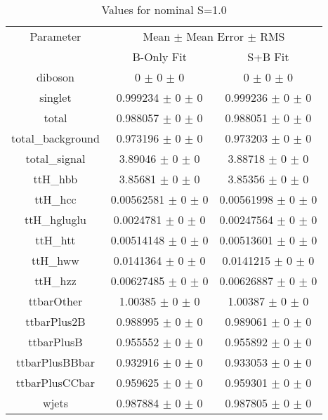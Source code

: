 \begin{table}
\centering
\caption{Values for nominal S=1.0}
\begin{tabular}{ccc}
\toprule
Parameter 	& \multicolumn{2}{c}{Mean $\pm$ Mean Error $\pm$ RMS}\\
 	& B-Only Fit & S+B Fit\\
\midrule
diboson 	& \num{0} $\pm$ \num{0} $\pm$ \num{0} 	& \num{0} $\pm$ \num{0} $\pm$ \num{0}\\
singlet 	& \num{0.999234} $\pm$ \num{0} $\pm$ \num{0} 	& \num{0.999236} $\pm$ \num{0} $\pm$ \num{0}\\
total 	& \num{0.988057} $\pm$ \num{0} $\pm$ \num{0} 	& \num{0.988051} $\pm$ \num{0} $\pm$ \num{0}\\
total\_background 	& \num{0.973196} $\pm$ \num{0} $\pm$ \num{0} 	& \num{0.973203} $\pm$ \num{0} $\pm$ \num{0}\\
total\_signal 	& \num{3.89046} $\pm$ \num{0} $\pm$ \num{0} 	& \num{3.88718} $\pm$ \num{0} $\pm$ \num{0}\\
ttH\_hbb 	& \num{3.85681} $\pm$ \num{0} $\pm$ \num{0} 	& \num{3.85356} $\pm$ \num{0} $\pm$ \num{0}\\
ttH\_hcc 	& \num{0.00562581} $\pm$ \num{0} $\pm$ \num{0} 	& \num{0.00561998} $\pm$ \num{0} $\pm$ \num{0}\\
ttH\_hgluglu 	& \num{0.0024781} $\pm$ \num{0} $\pm$ \num{0} 	& \num{0.00247564} $\pm$ \num{0} $\pm$ \num{0}\\
ttH\_htt 	& \num{0.00514148} $\pm$ \num{0} $\pm$ \num{0} 	& \num{0.00513601} $\pm$ \num{0} $\pm$ \num{0}\\
ttH\_hww 	& \num{0.0141364} $\pm$ \num{0} $\pm$ \num{0} 	& \num{0.0141215} $\pm$ \num{0} $\pm$ \num{0}\\
ttH\_hzz 	& \num{0.00627485} $\pm$ \num{0} $\pm$ \num{0} 	& \num{0.00626887} $\pm$ \num{0} $\pm$ \num{0}\\
ttbarOther 	& \num{1.00385} $\pm$ \num{0} $\pm$ \num{0} 	& \num{1.00387} $\pm$ \num{0} $\pm$ \num{0}\\
ttbarPlus2B 	& \num{0.988995} $\pm$ \num{0} $\pm$ \num{0} 	& \num{0.989061} $\pm$ \num{0} $\pm$ \num{0}\\
ttbarPlusB 	& \num{0.955552} $\pm$ \num{0} $\pm$ \num{0} 	& \num{0.955892} $\pm$ \num{0} $\pm$ \num{0}\\
ttbarPlusBBbar 	& \num{0.932916} $\pm$ \num{0} $\pm$ \num{0} 	& \num{0.933053} $\pm$ \num{0} $\pm$ \num{0}\\
ttbarPlusCCbar 	& \num{0.959625} $\pm$ \num{0} $\pm$ \num{0} 	& \num{0.959301} $\pm$ \num{0} $\pm$ \num{0}\\
wjets 	& \num{0.987884} $\pm$ \num{0} $\pm$ \num{0} 	& \num{0.987805} $\pm$ \num{0} $\pm$ \num{0}\\
\bottomrule
\end{tabular}
\end{table}
